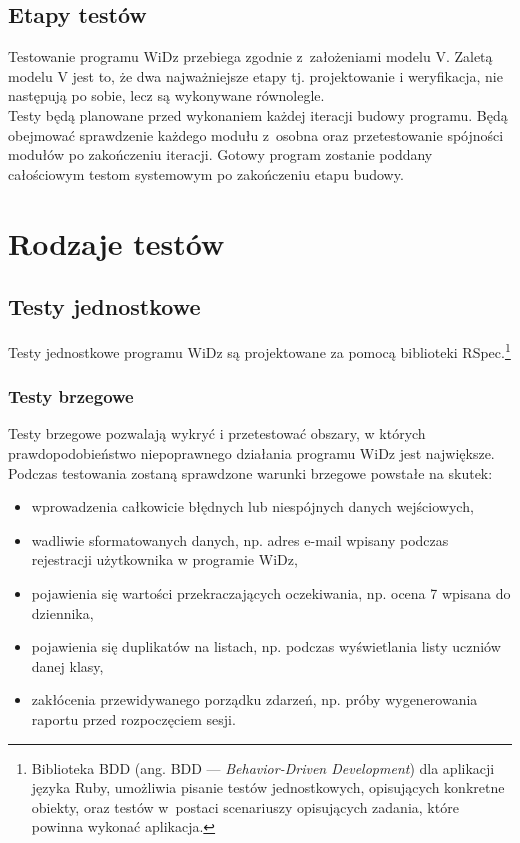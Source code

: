\documentclass[12pt,leqno,twoside]{mwart}
\begin{document}
\subsection{Etapy testów}
\noindent Testowanie programu WiDz przebiega zgodnie z~założeniami modelu V. Zaletą modelu V jest to, że dwa najważniejsze etapy tj. projektowanie i weryfikacja, nie następują po sobie, lecz są wykonywane równolegle. \\
\indent Testy będą planowane przed wykonaniem każdej iteracji budowy programu. Będą obejmować sprawdzenie każdego modułu z~osobna oraz przetestowanie spójności modułów po zakończeniu iteracji. Gotowy program zostanie poddany całościowym testom systemowym po zakończeniu etapu budowy.

\section{Rodzaje testów}
\subsection{Testy jednostkowe}
\noindent Testy jednostkowe programu WiDz są projektowane za pomocą biblioteki RSpec.\footnote{Biblioteka BDD (ang. BDD --- \textit{Behavior-Driven Development}) dla aplikacji języka Ruby, umożliwia pisanie testów jednostkowych, opisujących konkretne obiekty, oraz testów w~postaci scenariuszy opisujących zadania, które powinna wykonać aplikacja.} \\

\subsubsection{Testy brzegowe}
\noindent Testy brzegowe pozwalają wykryć i przetestować obszary, w których prawdopodobieństwo niepoprawnego działania programu WiDz jest największe. Podczas testowania zostaną sprawdzone warunki brzegowe powstałe na skutek: 
\begin{itemize}
	\item wprowadzenia całkowicie błędnych lub niespójnych danych wejściowych, 
	\item wadliwie sformatowanych danych, np. adres e-mail wpisany podczas rejestracji użytkownika w programie WiDz,
	\item pojawienia się wartości przekraczających oczekiwania, np. ocena 7 wpisana do dziennika,
	\item pojawienia się duplikatów na listach, np. podczas wyświetlania listy uczniów danej klasy,
	\item zakłócenia przewidywanego porządku zdarzeń, np. próby wygenerowania raportu przed rozpoczęciem sesji.
\end{itemize} 
\end{document}
